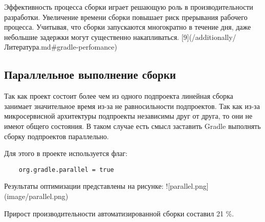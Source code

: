 Эффективность процесса сборки играет решающую роль в производительности разработки. Увеличение
времени сборки повышает риск прерывания рабочего процесса. Учитывая, что сборки запускаются
многократно в течение дня, даже небольшие задержки могут существенно
накапливаться. [9](/additionally/Литература.md\#gradle-perfomance)

\subsection{Параллельное выполнение сборки}

Так как проект состоит более чем из одного подпроекта линейная сборка занимает значительное время
из-за не равносильности подпроектов. Так как из-за микросервисной архитектуры подпроекты независимы
друг от друга, то они не имеют общего состояния. В таком случае есть смысл заставить Gradle
выполнять сборку подпроектов параллельно.

Для этого в проекте используется флаг:

\begin{lstlisting}
    org.gradle.parallel = true
\end{lstlisting}


Результаты оптимизации представлены на рисунке:
![parallel.png](image/parallel.png)

Прирост производительности автоматизированной сборки составил 21 \%.


